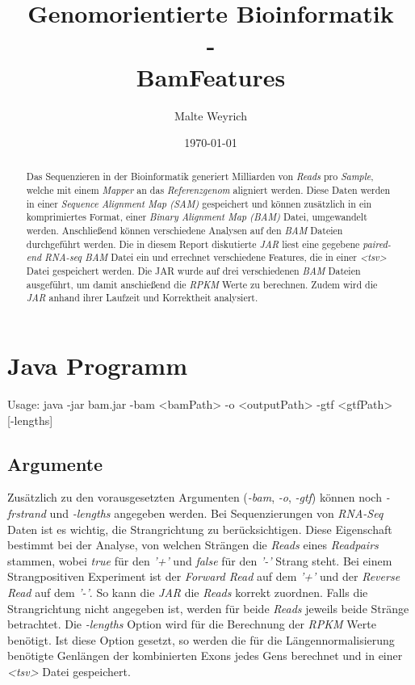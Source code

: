 \documentclass[12pt]{article}
\title{Genomorientierte Bioinformatik \\ - \\ BamFeatures}
\author{Malte Weyrich}
\date{\today}
\begin{document}
\maketitle
\begin{abstract}
Das Sequenzieren in der Bioinformatik generiert Milliarden von \textit{Reads} pro \textit{Sample}, welche mit
einem \textit{Mapper} an das \textit{Referenzgenom} aligniert werden. 
Diese Daten werden in einer \textit{Sequence Alignment Map (SAM)} gespeichert und können zusätzlich in ein komprimiertes Format,
einer \textit{Binary Alignment Map (BAM)} Datei, umgewandelt werden. Anschließend können verschiedene Analysen auf
den \textit{BAM} Dateien durchgeführt werden. Die in diesem Report diskutierte \textit{JAR} liest eine gegebene
\textit{paired-end RNA-seq BAM} Datei ein und errechnet verschiedene Features, die in einer \textit{<tsv>} Datei
gespeichert werden. Die JAR wurde auf drei verschiedenen \textit{BAM} Dateien ausgeführt, um damit
anschießend die \textit{RPKM} Werte zu berechnen. Zudem wird die \textit{JAR} anhand ihrer Laufzeit und
Korrektheit analysiert.

\end{abstract}

\newpage



\section{Java Programm}
\begin{verbatim*}
Usage:
    java -jar bam.jar -bam <bamPath> -o <outputPath> -gtf <gtfPath> \\
                      [-frstrand <true/false>] [-lengths]
\end{verbatim*}
\subsection{Argumente}
Zusätzlich zu den vorausgesetzten Argumenten (\textit{-bam}, \textit{-o}, \textit{-gtf}) können noch \textit{-frstrand} und
\textit{-lengths} angegeben werden. Bei Sequenzierungen von \textit{RNA-Seq} Daten ist es wichtig, die 
Strangrichtung zu berücksichtigen. Diese Eigenschaft bestimmt bei der Analyse, von welchen Strängen
die \textit{Reads} eines \textit{Readpairs} stammen, wobei \textit{true} für den \textit{’+’} und \textit{false} für den \textit{’-’} Strang steht. 
Bei einem Strangpositiven Experiment ist der \textit{Forward Read} auf dem \textit{’+’} und der \textit{Reverse Read} auf dem
\textit{’-’}. So kann die \textit{JAR} die \textit{Reads} korrekt zuordnen. 
Falls die Strangrichtung nicht angegeben ist, werden für beide \textit{Reads} jeweils beide Stränge betrachtet.
Die \textit{-lengths} Option wird für die Berechnung der \textit{RPKM} Werte benötigt. 
Ist diese Option gesetzt, so werden die für die Längennormalisierung benötigte Genlängen der kombinierten Exons jedes
Gens berechnet und in einer \textit{<tsv>} Datei gespeichert.
\end{document}
